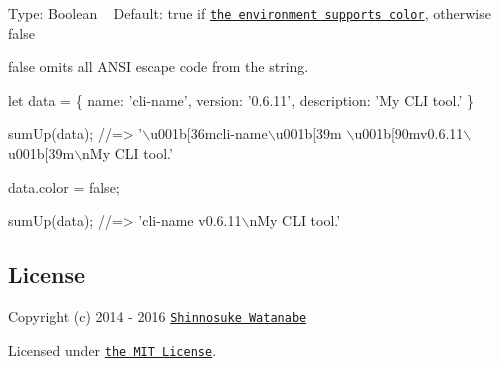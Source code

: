 Type\+: {\ttfamily Boolean} ~\newline
Default\+: {\ttfamily true} if \href{https://github.com/sindresorhus/supports-color}{\tt the environment supports color}, otherwise {\ttfamily false}

{\ttfamily false} omits all A\+N\+SI escape code from the string.


\begin{DoxyCode}
let data = \{
  name: 'cli-name',
  version: '0.6.11',
  description: 'My CLI tool.'
\}

sumUp(data); //=> '\(\backslash\)u001b[36mcli-name\(\backslash\)u001b[39m \(\backslash\)u001b[90mv0.6.11\(\backslash\)u001b[39m\(\backslash\)nMy CLI tool.'

data.color = false;

sumUp(data); //=> 'cli-name v0.6.11\(\backslash\)nMy CLI tool.'
\end{DoxyCode}


\subsection*{License}

Copyright (c) 2014 -\/ 2016 \href{https://github.com/shinnn}{\tt Shinnosuke Watanabe}

Licensed under \href{./LICENSE}{\tt the M\+IT License}. 